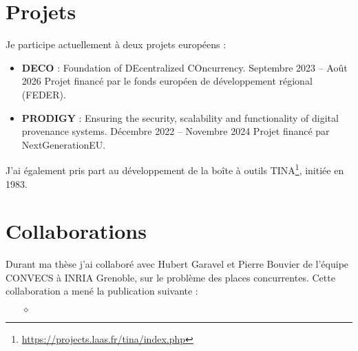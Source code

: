 \vspace{10pt}
\section{Projets}
\vspace{10pt}
Je participe actuellement à deux projets européens :

\begin{itemize}
  \item \textbf{DECO} : Foundation of DEcentralized COncurrency. 
  \smallbreak
  Septembre 2023 -- Août 2026
  \smallbreak
  Projet financé
  par le fonds européen de développement régional (FEDER).
  \smallbreak
  \item \textbf{PRODIGY} : Ensuring the security, scalability and functionality of digital provenance systems.
  \smallbreak
  Décembre 2022 -- Novembre 2024
  \smallbreak
  Projet financé par NextGenerationEU.
\end{itemize}
\smallbreak

J'ai également pris part au développement de la boîte à outils
TINA\footnote{\url{https://projects.laas.fr/tina/index.php}}, initiée en 1983.

\vspace{10pt}
\section{Collaborations}
\vspace{10pt}

Durant ma thèse j'ai collaboré avec Hubert Garavel et Pierre Bouvier de l'équipe
CONVECS à INRIA Grenoble, sur le problème des places concurrentes. Cette
collaboration a mené la publication suivante :

\begin{itemize}
  \item[$\diamond$] 
\end{itemize}


